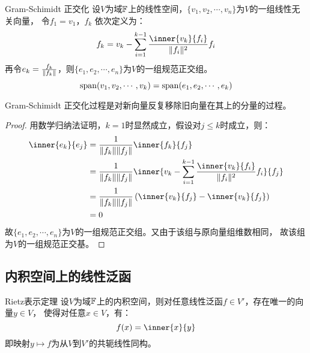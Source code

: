 \begin{theorem}{Gram-Schimidt 正交化}
    设\(V\)为域\(\mathbb{F}\)上的线性空间，\(\{v_1, v_2, \cdots, v_n\}\)为\(V\)的一组线性无关向量，
    令\(f_{1}= v_{1}\)，\(f_{k}\) 依次定义为：
    \[
        f_k = v_k - \sum_{i=1}^{k-1} \frac{\inner{v_k}{f_i}}{\norm{f_i}^{2}} f_i
    \]
    再令\(e_k = \frac{f_k}{\lVert f_k\rVert}\)，则\(\{e_1, e_2, \cdots,
    e_n\}\)为\(V\)的一组规范正交组。
    \[
        \operatorname{span}(v_1, v_2, \cdots, v_k) = \operatorname{span}(e_1, e_2, \cdots, e_k)
    \]
\end{theorem}

Gram-Schimidt 正交化过程是对新向量反复移除旧向量在其上的分量的过程。

\begin{proof}
    用数学归纳法证明，\(k=1\)时显然成立，假设对\(j\leq k\)时成立，则：
    \begin{align*}
        \inner{e_{k}}{e_{j}} &= \frac{1}{\norm{f_k} \norm{f_j}}
        \inner{f_k}{f_j} \\
        &= \frac{1}{\norm{f_k} \norm{f_j}} \inner{v_k -
        \sum_{i=1}^{k-1} \frac{\inner{v_k}{f_i}}{\norm{f_i}^{2}} f_i}{f_j} \\
        &= \frac{1}{\norm{f_k} \norm{f_j}} \left(
        \inner{v_{k}}{f_{j}} - \inner{v_{k}}{f_{j}} \right) \\
        &= 0
    \end{align*}
    故\(\{e_1, e_2, \cdots, e_n\}\)为\(V\)的一组规范正交组。又由于该组与原向量组维数相同，
    故该组为\(V\)的一组规范正交基。
\end{proof}


\subsection{内积空间上的线性泛函}

\begin{theorem}{Rietz表示定理}
    设\(V\)为域\(\mathbb{F}\)上的内积空间，则对任意线性泛函\(f \in V'\)，存在唯一的向量\(y \in V\)，
    使得对任意\(x \in V\)，有：
    \[
        f(x) = \inner{x}{y}
    \]
    即映射\(y \mapsto f\)为从\(V\)到\(V'\)的共轭线性同构。
\end{theorem}